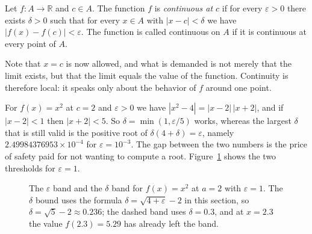 \begin{definisi}
Let $f\colon A\to\mathbb{R}$ and $c\in A$. The function $f$ is \emph{continuous at $c$}
if for every $\varepsilon>0$ there exists $\delta>0$ such that for every $x\in A$
with $|x-c|<\delta$ we have $|f(x)-f(c)|<\varepsilon$. The function is called continuous
on $A$ if it is continuous at every point of $A$.
\end{definisi}

Note that $x=c$ is now allowed, and what is demanded is not merely that the limit exists,
but that the limit equals the value of the function. Continuity is therefore local: it
speaks only about the behavior of $f$ around one point.

For $f(x)=x^{2}$ at $c=2$ and $\varepsilon>0$ we have $|x^{2}-4|=|x-2|\,|x+2|$, and
if $|x-2|<1$ then $|x+2|<5$. So $\delta=\min(1,\varepsilon/5)$ works, whereas the
largest $\delta$ that is still valid is the positive root of $\delta(4+\delta)=\varepsilon$,
namely $2.49984376953\times10^{-4}$ for $\varepsilon=10^{-3}$. The gap between the two numbers
is the price of safety paid for not wanting to compute a root.
Figure~\ref{fig:epsdelta} shows the two thresholds for $\varepsilon=1$.

\begin{figure}[htbp]
\centering
{}
\caption{The $\varepsilon$ band and the $\delta$ band for $f(x)=x^{2}$ at $a=2$ with
$\varepsilon=1$. The $\delta$ bound uses the formula $\delta=\sqrt{4+\varepsilon}-2$
in this section, so $\delta=\sqrt{5}-2\approx0.236$; the dashed band uses
$\delta=0.3$, and at $x=2.3$ the value $f(2.3)=5.29$ has already left the band.}
\label{fig:epsdelta}
\end{figure}

